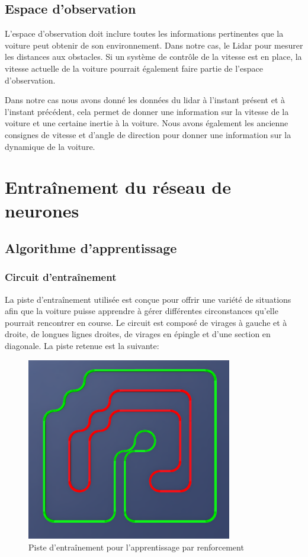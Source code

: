 \documentclass[french]{article}
\begin{document}
\subsection{Espace d'observation}
L'espace d'observation doit inclure toutes les informations pertinentes que la voiture peut obtenir de son environnement.
Dans notre cas, le Lidar pour mesurer les distances aux obstacles. Si un système de contrôle de 
la vitesse est en place, la vitesse actuelle de la voiture pourrait également faire partie de l'espace d'observation. 

\vspace{0.5cm}
Dans notre cas nous avons donné les données du lidar à l'instant présent et à l'instant précédent, cela permet
de donner une information sur la vitesse de la voiture et une certaine inertie à la voiture. Nous avons également
les ancienne consignes de vitesse et d'angle de direction pour donner une information sur la dynamique de la voiture.


\section{Entraînement du réseau de neurones}
\subsection{Algorithme d'apprentissage}
\subsubsection*{Circuit d'entraînement}
La piste d'entraînement utilisée est conçue pour offrir une variété de situations afin que la voiture puisse 
apprendre à gérer différentes circonstances qu'elle pourrait rencontrer en course. Le circuit est composé de virages 
à gauche et à droite, de longues lignes droites, de virages en épingle et d'une section en diagonale. 
La piste retenue est la suivante:

\begin{figure}[H]
\centering
\includegraphics[width=0.8\textwidth]{Images/Piste Entrainement.png}
\caption{Piste d'entraînement pour l'apprentissage par renforcement}
\end{figure}
\end{document}
